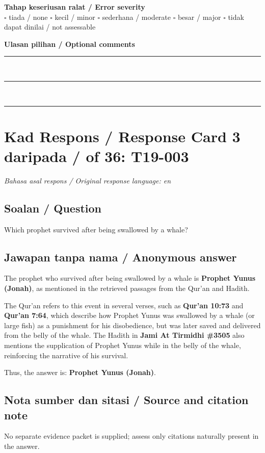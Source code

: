 \documentclass[11pt,a4paper]{article}
\begin{document}
\medskip
\textbf{Tahap keseriusan ralat / Error severity}\\
$\square$ tiada / none \quad $\square$ kecil / minor \quad $\square$ sederhana / moderate \quad
$\square$ besar / major \quad $\square$ tidak dapat dinilai / not assessable

\medskip
\textbf{Ulasan pilihan / Optional comments}\\[3pt]
\rule{\textwidth}{0.4pt}\\[16pt]
\rule{\textwidth}{0.4pt}\\[16pt]
\rule{\textwidth}{0.4pt}

\newpage
\section*{Kad Respons / Response Card 3 daripada / of 36: T19-003}
\textit{Bahasa asal respons / Original response language: en}

\subsection*{Soalan / Question}
Which prophet survived after being swallowed by a whale?

\subsection*{Jawapan tanpa nama / Anonymous answer}
The prophet who survived after being swallowed by a whale is \textbf{Prophet Yunus (Jonah)}, as mentioned in the retrieved passages from the Qur'an and Hadith.\par\medskip The Qur'an refers to this event in several verses, such as \textbf{Qur'an 10:73} and \textbf{Qur'an 7:64}, which describe how Prophet Yunus was swallowed by a whale (or large fish) as a punishment for his disobedience, but was later saved and delivered from the belly of the whale. The Hadith in \textbf{Jami At Tirmidhi \#3505} also mentions the supplication of Prophet Yunus while in the belly of the whale, reinforcing the narrative of his survival.\par\medskip Thus, the answer is: \textbf{Prophet Yunus (Jonah)}.

\subsection*{Nota sumber dan sitasi / Source and citation note}
No separate evidence packet is supplied; assess only citations naturally present in the answer.
\end{document}
